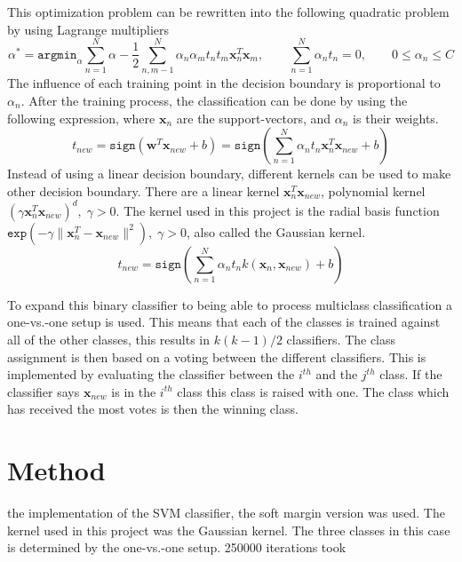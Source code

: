 This optimization problem can be rewritten into the following quadratic problem by using Lagrange multipliers
\begin{equation}
\alpha^* = 
\mathtt{argmin}_\alpha \sum_{n=1}^{N}\alpha - \frac{1}{2} 
\sum_{n,m-1}^{N} \alpha_n \alpha_m t_n t_m \mathbf{x}^T_n \mathbf{x}_m, 
\qquad \sum_{n=1}^{N} \alpha_n t_n = 0, \qquad
0\leq \alpha_n \leq C 
\end{equation}
The influence of each training point in the decision boundary is proportional to $ \alpha_n $.
After the training process, the classification can be done by using the following expression, where $ \mathbf{x}_n $  are the support-vectors, and $ \alpha_n $ is their weights.
\begin{equation}
t_{new} = 
\mathtt{sign}(\mathbf{w}^T \mathbf{x}_{new} +b) =
\mathtt{sign}\left( \sum_{n=1}^{N} \alpha_n t_n \mathbf{x}^T_n \mathbf{x}_{new} +b  \right) 
\end{equation} 
Instead of using a linear decision boundary, different kernels can be used to make other decision boundary.
There are a linear kernel $ \mathbf{x}^T_n \mathbf{x}_{new} $, polynomial kernel $ (\gamma \mathbf{x}^T_n \mathbf{x}_{new} )^d,\; \gamma > 0 $.
The kernel used in this project is the radial basis function $ \mathtt{exp}(-\gamma \|\mathbf{x}^T_n - \mathbf{x}_{new} \|^2 ), \; \gamma > 0 $, also called the Gaussian kernel.
\begin{equation}
t_{new} = 
\mathtt{sign}\left( \sum_{n=1}^{N} \alpha_n t_n k(\mathbf{x}_n,\mathbf{x}_{new}) +b  \right)
\end{equation}

To expand this binary classifier to being able to process multiclass classification a one-vs.-one setup is used. 
This means that each of the classes is trained against all of the other classes, this results in $ k(k-1)/2 $ classifiers. 
The class assignment is then based on a voting between the different classifiers. 
This is implemented by evaluating the classifier between the $ i^{th} $ and the $ j^{th} $ class.
If the classifier says $ \mathbf{x}_{new} $ is in the $ i^{th} $ class this class is raised with one.
The class which has received the most votes is then the winning class.
 
\section{Method}
the implementation of the SVM classifier, the soft margin version was used.
The kernel used in this project was the Gaussian kernel.  
The three classes in this case is determined by the one-vs.-one setup. 
250000 iterations took

